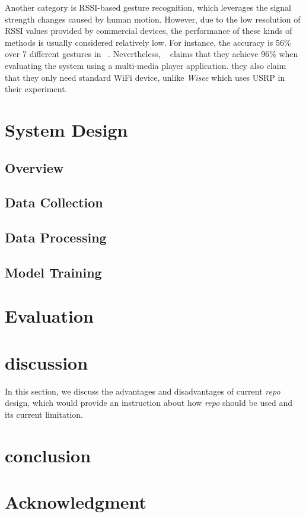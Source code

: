 \documentclass[conference]{IEEEtran}
\begin{document}
Another category is RSSI-based gesture recognition, which leverages the signal strength changes caused by human motion.
However, due to the low resolution of RSSI values provided by commercial devices, the performance of these kinds of methods is usually considered relatively low.
For instance, the accuracy is 56\% over 7 different gestures in ~\cite{sigg2014telepathic}.
Nevertheless, ~\cite{abdelnasser2015wigest} claims that they achieve 96\% when evaluating the system using a multi-media player application.
they also claim that they only need standard WiFi device, unlike \emph{Wisee} which uses USRP in their experiment.
\section{System Design} \label{section-design}
\subsection{Overview}
\subsection{Data Collection}


\subsection{Data Processing}


\subsection{Model Training}


\section{Evaluation} \label{section-evaluation}



\section{discussion} \label{section-discussion}

In this section, we discuss the advantages and disadvantages of current \emph{repo} design, which would provide an instruction about how \emph{repo} should be used and its current limitation.


\section{conclusion} \label{section-conclusion}


\section*{Acknowledgment}




\end{document}
